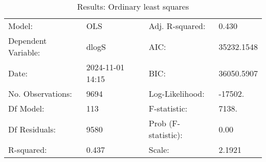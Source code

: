 \begin{table}
\caption{Results: Ordinary least squares}
\label{}
\begin{center}
\begin{tabular}{llll}
\hline
Model:              & OLS              & Adj. R-squared:     & 0.430       \\
Dependent Variable: & dlogS            & AIC:                & 35232.1548  \\
Date:               & 2024-11-01 14:15 & BIC:                & 36050.5907  \\
No. Observations:   & 9694             & Log-Likelihood:     & -17502.     \\
Df Model:           & 113              & F-statistic:        & 7138.       \\
Df Residuals:       & 9580             & Prob (F-statistic): & 0.00        \\
R-squared:          & 0.437            & Scale:              & 2.1921      \\
\hline
\end{tabular}
\end{center}


\end{table}
